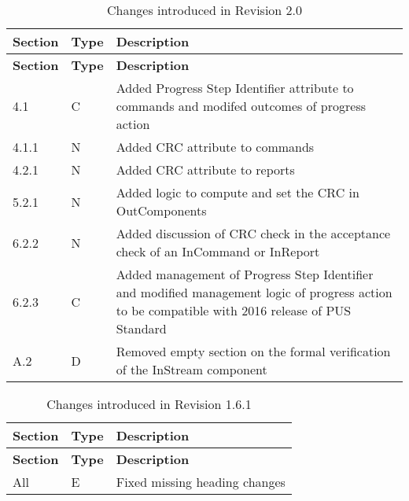 \documentclass{pnp_article}
\begin{document}
\begin{longtable}{|p{1.5cm}|p{1cm}|p{8cm}|}
\caption{Changes introduced in Revision 2.0}  \\
\hline
\rowcolor{light-gray}
\textbf{Section} & \textbf{Type} & \textbf{Description} \\
\hline\hline
\endfirsthead
\rowcolor{light-gray}
\textbf{Section} & \textbf{Type} & \textbf{Description} \\
\hline\hline
\endhead
4.1 & C & Added Progress Step Identifier attribute to commands and modifed outcomes of progress action \\
\hline
4.1.1 & N & Added CRC attribute to commands \\
\hline
4.2.1 & N & Added CRC attribute to reports \\
\hline
5.2.1 & N & Added logic to compute and set the CRC in OutComponents \\
\hline
6.2.2 & N & Added discussion of CRC check in the acceptance check of an InCommand or InReport \\
\hline
6.2.3 & C & Added management of Progress Step Identifier and modified management logic of progress action to be compatible with 2016 release of PUS Standard \\
\hline
A.2 & D & Removed empty section on the formal verification of the InStream component \\
\hline
\end{longtable}


\begin{longtable}{|p{1.5cm}|p{1cm}|p{8cm}|}
\caption{Changes introduced in Revision 1.6.1}  \\
\hline
\rowcolor{light-gray}
\textbf{Section} & \textbf{Type} & \textbf{Description} \\
\hline\hline
\endfirsthead
\rowcolor{light-gray}
\textbf{Section} & \textbf{Type} & \textbf{Description} \\
\hline\hline
\endhead
All & E & Fixed missing heading changes \\
\hline
\end{longtable}
\end{document}

